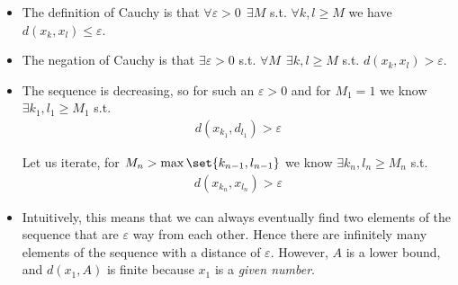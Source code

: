 \documentclass{article}
\begin{document}
\begin{enumerate}
\begin{itemize}[label=$\circ$]
      \item The definition of Cauchy is that $\forall \varepsilon > 0 ~~ \exists M$ s.t. $\forall k, l \ge M$ we have $d(x_k, x_l) \le \varepsilon$.

      \item The negation of Cauchy is that $\exists \varepsilon > 0$ s.t. $\forall M ~~ \exists k, l \ge M$ s.t. $d(x_k, x_l) > \varepsilon$.

      \item The sequence is decreasing, so for such an $\varepsilon > 0$ and for $M_1 = 1$ we know $\exists k_1, l_1 \ge M_1$ s.t.
        \begin{align*}
          d(x_{k_1}, d_{l_1}) > \varepsilon
        \end{align*}

        Let us iterate, for $M_n > \max\set{k_{n - 1}, l_{ n -1}}$ we know $\exists k_n, l_n \ge M_n$ s.t.
        \begin{align*}
          d(x_{k_n}, x_{l_n}) > \varepsilon
        \end{align*}

      \item Intuitively, this means that we can always eventually find two elements of the sequence that are $\varepsilon$ way from each other. Hence there are infinitely many elements of the sequence with a distance of $\varepsilon$. However, $A$ is a lower bound, and $d(x_1, A)$ is finite because $x_1$ is a \textit{given number}.

        \begin{figure}[H]
          \centering
\end{figure}
\end{itemize}
\end{enumerate}
\end{document}
